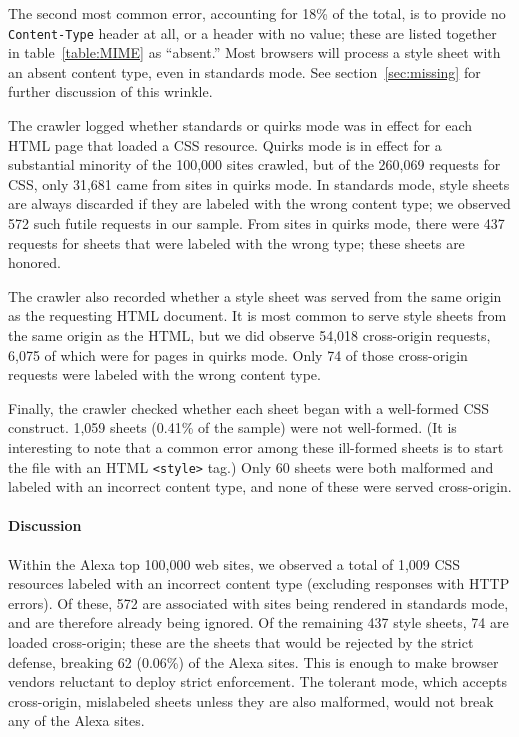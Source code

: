 \documentclass{acm_proc_article-sp}
\begin{document}
The second most common error, accounting for 18\% of the total, is to
provide no \texttt{Content-Type} header at all, or a header with no
value; these are listed together in table~\ref{table:MIME} as
“absent.”  Most browsers will process a style sheet with an absent
content type, even in standards mode.  See
section~\ref{sec:missing} for further discussion of this wrinkle.

The crawler logged whether standards or quirks mode was in effect for
each HTML page that loaded a CSS resource.  Quirks mode is in effect
for a substantial minority of the 100,000 sites crawled, but of the
260,069 requests for CSS, only 31,681 came from sites in quirks mode.
In standards mode, style sheets are always discarded if they are
labeled with the wrong content type; we observed 572 such
futile requests in our sample.  From sites in quirks mode, there were
437 requests for sheets that were labeled with the wrong type; these
sheets are honored.

The crawler also recorded whether a style sheet was served from the
same origin as the requesting HTML document.  It is most common to
serve style sheets from the same origin as the HTML, but we did
observe 54,018 cross-origin requests, 6,075 of which were for pages in
quirks mode.  Only 74 of those cross-origin requests were labeled with
the wrong content type.

Finally, the crawler checked whether each sheet began with a
well-formed CSS construct.  1,059 sheets (0.41\% of the sample) were
not well-formed.  (It is interesting to note that a common error among
these ill-formed sheets is to start the file with an HTML
\verb|<style>| tag.)  Only 60 sheets were both malformed and labeled
with an incorrect content type, and none of these were served
cross-origin.

\paragraph{Discussion}
Within the Alexa top 100,000 web sites, we observed a total of 1,009
CSS resources labeled with an incorrect content type (excluding responses
with HTTP errors).  Of these, 572 are associated with sites being
rendered in standards mode, and are therefore already being ignored.
Of the remaining 437 style sheets, 74 are loaded cross-origin; these
are the sheets that would be rejected by the strict defense, breaking
62 (0.06\%) of the Alexa sites.  This is enough to make browser
vendors reluctant to deploy strict enforcement.  The tolerant mode,
which accepts cross-origin, mislabeled sheets unless they are also
malformed, would not break any of the Alexa sites.
\end{document}
